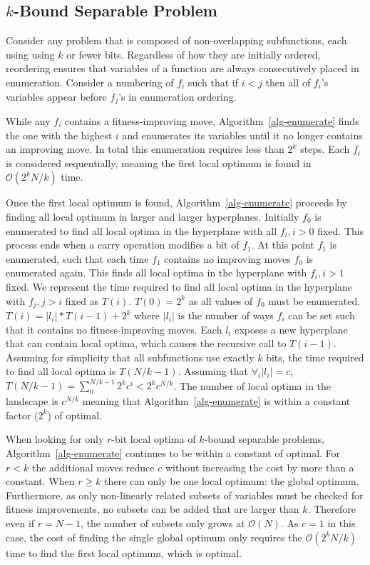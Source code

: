 \documentclass[runningheads,a4paper]{llncs}
\newcommand{\BigO}[1]{$\mathcal{O}{(#1)}$}
\begin{document}
\subsection{$k$-Bound Separable Problem}
Consider any problem that is composed of non-overlapping
subfunctions, each using using $k$ or fewer bits. Regardless
of how they are initially ordered, reordering ensures that
variables of a function are always consecutively placed in enumeration.
Consider a numbering of $f_i$ such that if $i < j$ then all of $f_i$'s
variables appear before $f_j$'s in enumeration ordering.

While any $f_i$ contains a fitness-improving move, Algorithm~\ref{alg-enumerate}
finds the one with the highest $i$ and enumerates its variables until it no longer
contains an improving move. In total this enumeration requires less than $2^k$
steps. Each $f_i$ is considered sequentially, meaning the first local optimum
is found in \BigO{2^kN/k} time.

Once the first local optimum is found, Algorithm~\ref{alg-enumerate} proceeds
by finding all local optimum in larger and larger hyperplanes. Initially $f_0$
is enumerated to find all local optima in the hyperplane with all $f_i, i>0$
fixed. This process ends when a carry operation modifies a bit of $f_1$. At
this point $f_1$ is enumerated, such that each time $f_1$ contains no improving moves
$f_0$ is enumerated again. This finds all local optima in the hyperplane with $f_i, i>1$
fixed. We represent the time required to find all local optima in the hyperplane
with $f_j, j>i$ fixed as $T(i)$. $T(0)=2^k$ as all values of $f_0$ must be enumerated.
$T(i) = |l_i|*T(i-1)+2^k$ where $|l_i|$ is the number of ways $f_i$ can be set such
that it contains no fitness-improving moves. Each $l_i$ exposes a new hyperplane
that can contain local optima, which causes the recursive call to $T(i-1)$.
Assuming for simplicity that all subfunctions use exactly $k$ bits,
the time required to find all local optima is $T(N/k-1)$.
Assuming that $\forall_i |l_i|=c$, $T(N/k-1)=\sum_0^{N/k-1}2^kc^i<2^kc^{N/k}$.
The number of local optima in the landscape is $c^{N/k}$ meaning that Algorithm~\ref{alg-enumerate}
is within a constant factor ($2^k$) of optimal.

When looking for only $r$-bit local optima of $k$-bound separable problems,
Algorithm~\ref{alg-enumerate} continues to be within a constant of optimal.
For $r < k$ the additional moves reduce $c$ without increasing the cost
by more than a constant.
When $r \geq k$ there can only be one local optimum: the global optimum. Furthermore, as
only non-linearly related subsets of variables must be checked
for fitness improvements, no subsets can be added that are larger than $k$.
Therefore even if $r=N-1$, the number of subsets only grows at \BigO{N}.
As $c=1$ in this case, the cost of finding the single global optimum
only requires the \BigO{2^kN/k} time to find the first local optimum, which is
optimal.
\end{document}
